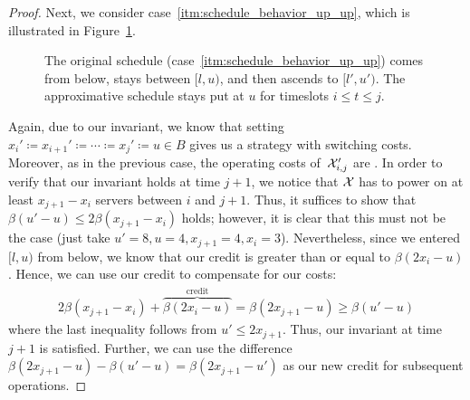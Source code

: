 \begin{proof}
Next, we consider case~\ref{itm:schedule_behavior_up_up}, which is illustrated in Figure~\ref{fig:schedule_behavior_up_up}.
\begin{figure}[ht]
\centering
	
\caption{The original schedule (case~\ref{itm:schedule_behavior_up_up}) comes from below, stays between $[l,u)$, and then ascends to $[l',u')$. The approximative schedule stays put at $u$ for timeslots $i\le t\le j$.}
\label{fig:schedule_behavior_up_up}
\end{figure}
Again, due to our invariant, we know that setting $x_i'\coloneqq x_{i+1}'\coloneqq\dotsb\coloneqq x_j'\coloneqq u\in B$ gives us a strategy with  switching costs. Moreover, as in the previous case, the operating costs of~$\mathcal{X}_{i,j}'$ are . In order to verify that our invariant holds at time $j+1$, we notice that $\mathcal{X}$ has to power on at least $x_{j+1}-x_i$ servers between $i$ and $j+1$. Thus, it suffices to show that $\beta(u'-u)\le2\beta(x_{j+1}-x_i)$ holds; however, it is clear that this must not be the case (just take $u'=8,u=4,x_{j+1}=4,x_i=3$). Nevertheless, since we entered $[l,u)$ from below, we know that our credit is greater than or equal to $\beta(2x_i-u)$. Hence, we can use our credit to compensate for our costs:
\begin{align*}
	2\beta(x_{j+1}-x_i)+\overbrace{\beta(2x_i-u)}^{\text{credit}}=\beta(2x_{j+1}-u)\ge\beta(u'-u)
\end{align*}
where the last inequality follows from $u'\le2x_{j+1}$. Thus, our invariant at time $j+1$ is satisfied. Further, we can use the difference $\beta(2x_{j+1}-u)-\beta(u'-u)=\beta(2x_{j+1}-u')$ as our new credit for subsequent operations. 
	

\end{proof}
